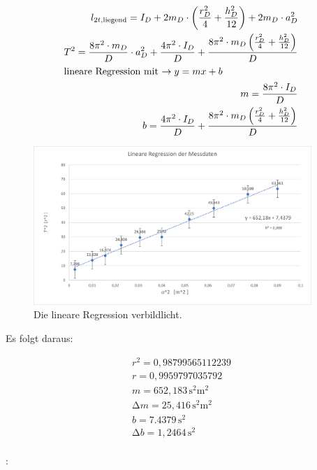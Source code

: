 \begin{align*}
     l_{2t, \text{liegend}} = I_{D} + 2m_{D} \cdot \left(\frac{r_{D}^2}{4} + \frac{h_{D}^2}{12}\right) + 2m_{D} \cdot a_{D}^2  \\
     T^2 = \frac{8\pi^2 \cdot m_{D}}{D} \cdot a_{D}^2 + \frac{4\pi^2 \cdot I_{D}}{D}   + \frac{ 8\pi^2 \cdot m_{D} \left(\frac{r_{D}^2}{4} + \frac{h_{D}^2}{12}\right) }{D} \\
     \intertext{lineare Regression mit  $\to y = mx+b$}
     m = \frac{8\pi^2 \cdot I_{D}}{D}  \\
     b = \frac{ 4\pi^2 \cdot I_{D}}{D} + \frac{ 8\pi^2 \cdot m_{D} \left(\frac{r_{D}^2}{4} + \frac{h_{D}^2}{12}\right) }{D}  \\
\end{align*}


\begin{figure}
    \centering
    \includegraphics[height=60mm]{bilder/linearereg.png}
    \caption{Die lineare Regression verbildlicht. \label{Abbildung6}}
\end{figure}

\begin{flushleft}
    Es folgt daraus: 
\end{flushleft}

\begin{align*}
     r^2 = 0,98799565112239  \\
     r = 0,9959797035792  \\
     m = 652,183\, \unit{\second^2\meter^2} \\
     \increment m = 25,416\, \unit{\second^2\meter^2}  \\
     b = 7.4379\,\unit{\second^2}  \\
     \increment b = 1,2464\,\unit{\second^2}   \\
\end{align*}

:



